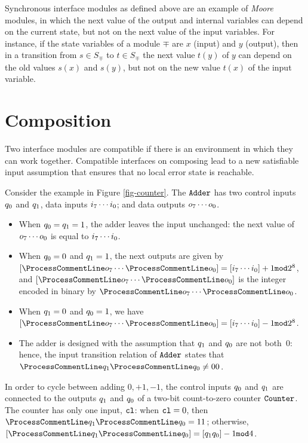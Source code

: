 Synchronous interface modules as defined above are an example of
{\em Moore\/} modules, in which the next value of the output and
internal variables can depend on the current state, but not on the
next value of the input variables. For instance, if the state
variables of a module $\mp$ are $x$ (input) and $y$ (output), then
in a transition from $s \in S_\mp$ to $t \in S_\mp$ the next value
$t(y)$ of $y$ can depend on the old values $s(x)$ and $s(y)$, but
not on the new value $t(x)$ of the input variable.

\section{Composition}
Two interface modules are compatible if there is an environment in
which they can work together. Compatible interfaces on composing
lead to a new satisfiable input assumption that ensures that no
local error state is reachable.

Consider the example in Figure \ref{fig-counter}. The ${\tt Adder}$ has
two control inputs $q_0$ and $q_1$, data inputs $i_7
\cdots i_0$; and data outputs $o_7 \cdots o_0$.
\begin{itemize}

\item When $q_0 = q_1 = 1$, the adder leaves the input
unchanged: the next value of $o_7 \cdots o_0$ is equal to
$i_7 \cdots i_0$.

\item When $q_0 = 0$ and $q_1 = 1$, the next outputs are given
by $[\nx{o}_7 \cdots \nx{o}_0] = [\id_7 \cdots\id_0] + 1 \mod
2^8$, and $[\nx{o}_7 \cdots \nx{o}_0]$ is the integer encoded in
binary by $\nx{o}_7 \cdots \nx{o}_0$.

\item When $q_1 = 0$ and $q_0 = 1$, we have  $[\nx{o}_7 \cdots
\nx{o}_0] = [\id_7 \cdots\id_0] - 1 \mod 2^8$.

\item The adder is designed with the assumption that $q_1$ and
$q_0$ are not both~$0$: hence, the input transition relation of
${\tt Adder}$ states that $\nx{q}_1 \nx{q}_0 \neq 00$.
\end{itemize}

In order to cycle between adding $0, +1, -1$, the control inputs
$q_0$ and $q_1$ are connected to the outputs $q_1$ and
$q_0$ of a two-bit count-to-zero counter ${\tt Counter}$. The counter
has only one input, ${\tt cl}$: when ${\tt cl} = 0$, then $\nx{q}_1
\nx{q}_0 = 11$; otherwise, $[\nx{q}_1 \nx{q}_0] = [\oq_1 \oq_0] -
1 \mod 4$.

